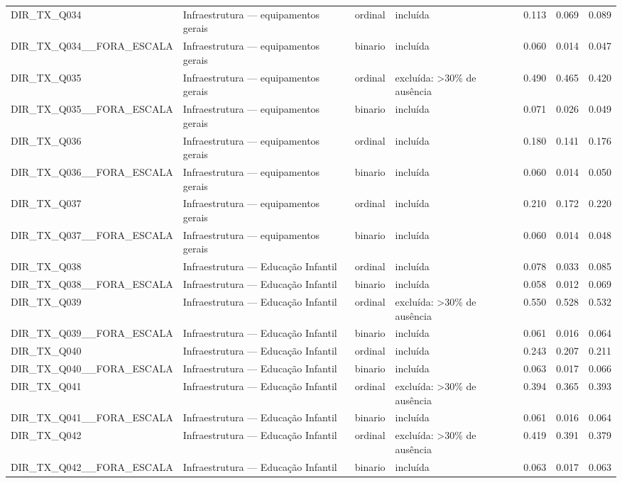 \begin{tabular}{llllrrr}
DIR\_TX\_Q034 & Infraestrutura — equipamentos gerais & ordinal & incluída & 0.113 & 0.069 & 0.089 \\
DIR\_TX\_Q034\_\_FORA\_ESCALA & Infraestrutura — equipamentos gerais & binario & incluída & 0.060 & 0.014 & 0.047 \\
DIR\_TX\_Q035 & Infraestrutura — equipamentos gerais & ordinal & excluída: >30\% de ausência & 0.490 & 0.465 & 0.420 \\
DIR\_TX\_Q035\_\_FORA\_ESCALA & Infraestrutura — equipamentos gerais & binario & incluída & 0.071 & 0.026 & 0.049 \\
DIR\_TX\_Q036 & Infraestrutura — equipamentos gerais & ordinal & incluída & 0.180 & 0.141 & 0.176 \\
DIR\_TX\_Q036\_\_FORA\_ESCALA & Infraestrutura — equipamentos gerais & binario & incluída & 0.060 & 0.014 & 0.050 \\
DIR\_TX\_Q037 & Infraestrutura — equipamentos gerais & ordinal & incluída & 0.210 & 0.172 & 0.220 \\
DIR\_TX\_Q037\_\_FORA\_ESCALA & Infraestrutura — equipamentos gerais & binario & incluída & 0.060 & 0.014 & 0.048 \\
DIR\_TX\_Q038 & Infraestrutura — Educação Infantil & ordinal & incluída & 0.078 & 0.033 & 0.085 \\
DIR\_TX\_Q038\_\_FORA\_ESCALA & Infraestrutura — Educação Infantil & binario & incluída & 0.058 & 0.012 & 0.069 \\
DIR\_TX\_Q039 & Infraestrutura — Educação Infantil & ordinal & excluída: >30\% de ausência & 0.550 & 0.528 & 0.532 \\
DIR\_TX\_Q039\_\_FORA\_ESCALA & Infraestrutura — Educação Infantil & binario & incluída & 0.061 & 0.016 & 0.064 \\
DIR\_TX\_Q040 & Infraestrutura — Educação Infantil & ordinal & incluída & 0.243 & 0.207 & 0.211 \\
DIR\_TX\_Q040\_\_FORA\_ESCALA & Infraestrutura — Educação Infantil & binario & incluída & 0.063 & 0.017 & 0.066 \\
DIR\_TX\_Q041 & Infraestrutura — Educação Infantil & ordinal & excluída: >30\% de ausência & 0.394 & 0.365 & 0.393 \\
DIR\_TX\_Q041\_\_FORA\_ESCALA & Infraestrutura — Educação Infantil & binario & incluída & 0.061 & 0.016 & 0.064 \\
DIR\_TX\_Q042 & Infraestrutura — Educação Infantil & ordinal & excluída: >30\% de ausência & 0.419 & 0.391 & 0.379 \\
DIR\_TX\_Q042\_\_FORA\_ESCALA & Infraestrutura — Educação Infantil & binario & incluída & 0.063 & 0.017 & 0.063 \\

\end{tabular}
